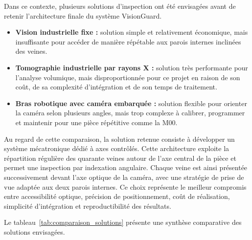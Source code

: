 Dans ce contexte, plusieurs solutions d'inspection ont été envisagées avant de retenir
l'architecture finale du système VisionGuard.

\begin{itemize}
    \item \textbf{Vision industrielle fixe :} solution simple et relativement économique, 
    mais insuffisante pour accéder de manière répétable aux parois internes inclinées des veines.
    
    \item \textbf{Tomographie industrielle par rayons X :} solution très performante pour l'analyse volumique, 
    mais disproportionnée pour ce projet en raison de son coût, de sa complexité d'intégration et de son temps de traitement.
    
    \item \textbf{Bras robotique avec caméra embarquée :} solution flexible pour orienter la caméra selon plusieurs angles, 
    mais trop complexe à calibrer, programmer et maintenir pour une pièce répétitive comme la M00.
\end{itemize}

Au regard de cette comparaison, la solution retenue consiste à développer un système mécatronique dédié à axes contrôlés. 
Cette architecture exploite la répartition régulière des quarante veines autour de l'axe central de la pièce et permet 
une inspection par indexation angulaire. Chaque veine est ainsi présentée successivement devant l'axe optique de la caméra, 
avec une stratégie de prise de vue adaptée aux deux parois internes. Ce choix représente le meilleur compromis entre accessibilité optique, 
précision de positionnement, coût de réalisation, simplicité d'intégration et reproductibilité des résultats.

\medskip
Le tableau~\ref{tab:comparaison_solutions} présente une synthèse comparative des solutions
envisagées.

